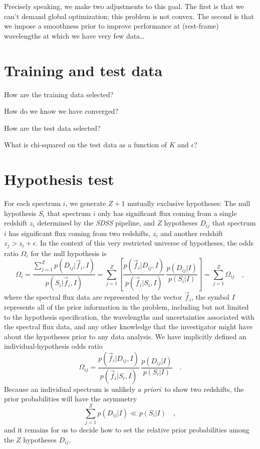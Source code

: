 \documentclass[12pt]{article}
\newcommand{\facility}[1]{\textsl{#1}}
\newcommand{\foreign}[1]{\textsl{#1}}
\newcommand{\apriori}{\foreign{a priori}}
\newcommand{\fluxvec}{\vec{f}}
\begin{document}
Precisely speaking, we make two adjustments to this goal.  The first
is that we can't demand global optimization; this problem is not
convex.  The second is that we impose a smoothness prior to improve
performance at (rest-frame) wavelengths at which we have very few
data\ldots

\section{Training and test data}

How are the training data selected?

How do we know we have converged?

How are the test data selected?

What is chi-squared on the test data as a function of $K$ and $\epsilon$?

\section{Hypothesis test}

For each spectrum $i$, we generate $Z+1$ mutually exclusive hypotheses:
The null hypothesis $S_i$ that spectrum $i$ only has significant flux
coming from a single redshift $z_i$ determined by the \facility{SDSS}
pipeline, and $Z$ hypotheses $D_{ij}$ that spectrum $i$ has significant
flux coming from two redshifts, $z_i$ and another redshift
$z_j>z_i+\epsilon$.  In the context of this very restricted universe
of hypotheses, the odds ratio $\Omega_i$ for the null hypothesis is
\begin{equation}\label{eq:odds}
\Omega_i = \frac{\sum_{j=1}^Z p(D_{ij}|\fluxvec_i,I)}{p(S_i|\fluxvec_i,I)}
 = \sum_{j=1}^Z \left[\frac{p(\fluxvec_i|D_{ij},I)}{p(\fluxvec_i|S_i,I)}
 \,\frac{p(D_{ij}|I)}{p(S_i|I)}\right] = \sum_{j=1}^Z\Omega_{ij}\quad,
\end{equation}
where the spectral flux data are represented by the vector
$\fluxvec_i$, the symbol $I$ represents all of the prior information
in the problem, including but not limited to the hypothesis
specification, the wavelengths and uncertainties associated with the
spectral flux data, and any other knowledge that the investigator
might have about the hypotheses prior to any data analysis.  We have
implicitly defined an individual-hypothesis odds ratio
\begin{equation}
\Omega_{ij} = \frac{p(\fluxvec_i|D_{ij},I)}{p(\fluxvec_i|S_i,I)}
  \,\frac{p(D_{ij}|I)}{p(S_i|I)}\quad.
\end{equation}
Because an individual spectrum is unlikely \apriori\ to show two
redshifts, the prior probabilities will have the asymmetry
\begin{equation}
\sum_{j=1}^Z p(D_{ij}|I) \ll p(S_i|I) \quad,
\end{equation}
and it remains for us to decide how to set the relative prior
probabilities among the $Z$ hypotheses $D_{ij}$.
\end{document}
